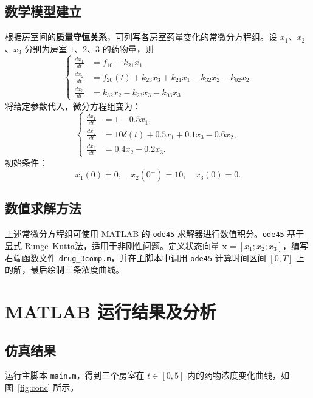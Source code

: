 \subsection{数学模型建立}
根据房室间的\textbf{质量守恒关系}，可列写各房室药量变化的常微分方程组。设 $x_1$、$x_2$、$x_3$ 分别为房室 $1$、$2$、$3$ 的药物量，则
$$
\begin{cases}
    \frac{dx_1}{dt} &= f_{10} - k_{21}x_1 \\
    \frac{dx_2}{dt} &= f_{20}(t) + k_{23}x_3 +k_{21}x_1 - k_{32}x_2 - k_{02}x_2 \\
    \frac{dx_3}{dt} &= k_{32}x_2 - k_{23}x_3 - k_{03}x_3 \label{eq:dx3}
\end{cases}
$$
将给定参数代入，微分方程组变为：
$$
\begin{cases}
\frac{dx_1}{dt} &= 1 - 0.5x_1, \\
\frac{dx_2}{dt} &= 10\delta(t) + 0.5x_1 + 0.1x_3 - 0.6x_2, \\
\frac{dx_3}{dt} &= 0.4x_2 - 0.2x_3.
\end{cases}
$$
初始条件：
\begin{equation}
    x_1(0)=0,\quad x_2(0^+)=10,\quad x_3(0)=0.
\end{equation}

\subsection{数值求解方法}
上述常微分方程组可使用 MATLAB 的 \texttt{ode45} 求解器进行数值积分。\texttt{ode45} 基于显式 Runge--Kutta法，适用于非刚性问题。定义状态向量 $\bm{x}=[x_1;x_2;x_3]$，编写右端函数文件 \texttt{drug\_3comp.m}，并在主脚本中调用 \texttt{ode45} 计算时间区间 $[0,T]$ 上的解，最后绘制三条浓度曲线。

\section{MATLAB 运行结果及分析}

\subsection{仿真结果}
运行主脚本 \texttt{main.m}，得到三个房室在 $t\in[0,5]$ 内的药物浓度变化曲线，如图~\ref{fig:conc} 所示。

